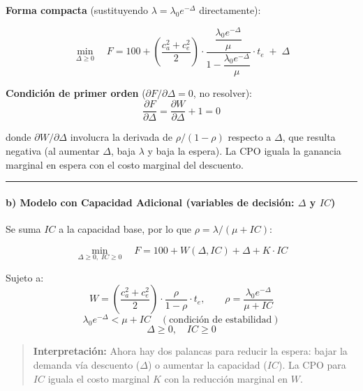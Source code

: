 \documentclass[
]{article}
\begin{document}
\textbf{Forma compacta} (sustituyendo
\(\lambda = \lambda_0 e^{-\Delta}\) directamente):

\[\min_{\Delta \ge 0} \quad F = 100 + \left(\frac{c_a^2 + c_e^2}{2}\right) \cdot \frac{\dfrac{\lambda_0 e^{-\Delta}}{\mu}}{1 - \dfrac{\lambda_0 e^{-\Delta}}{\mu}} \cdot t_e \;+\; \Delta\]

\textbf{Condición de primer orden}
(\(\partial F / \partial \Delta = 0\), no resolver):
\[\frac{\partial F}{\partial \Delta} = \frac{\partial W}{\partial \Delta} + 1 = 0\]

donde \(\partial W / \partial \Delta\) involucra la derivada de
\(\rho/(1-\rho)\) respecto a \(\Delta\), que resulta negativa (al
aumentar \(\Delta\), baja \(\lambda\) y baja la espera). La CPO iguala
la ganancia marginal en espera con el costo marginal del descuento.

\begin{center}\rule{0.5\linewidth}{0.5pt}\end{center}

\hypertarget{b-modelo-con-capacidad-adicional-variables-de-decisiuxf3n-delta-y-ic}{%
\paragraph{\texorpdfstring{b) Modelo con Capacidad Adicional (variables
de decisión: \(\Delta\) y
\(IC\))}{b) Modelo con Capacidad Adicional (variables de decisión: \textbackslash Delta y IC)}}\label{b-modelo-con-capacidad-adicional-variables-de-decisiuxf3n-delta-y-ic}}

Se suma \(IC\) a la capacidad base, por lo que
\(\rho = \lambda / (\mu + IC)\):

\[\min_{\Delta \ge 0,\; IC \ge 0} \quad F = 100 + W(\Delta, IC) + \Delta + K \cdot IC\]

Sujeto a:
\[W = \left(\frac{c_a^2 + c_e^2}{2}\right) \cdot \frac{\rho}{1 - \rho} \cdot t_e, \qquad \rho = \frac{\lambda_0 e^{-\Delta}}{\mu + IC}\]
\[\lambda_0 e^{-\Delta} < \mu + IC \quad (\text{condición de estabilidad})\]
\[\Delta \ge 0, \quad IC \ge 0\]

\begin{quote}
\textbf{Interpretación:} Ahora hay dos palancas para reducir la espera:
bajar la demanda vía descuento (\(\Delta\)) o aumentar la capacidad
(\(IC\)). La CPO para \(IC\) iguala el costo marginal \(K\) con la
reducción marginal en \(W\).
\end{quote}
\end{document}
